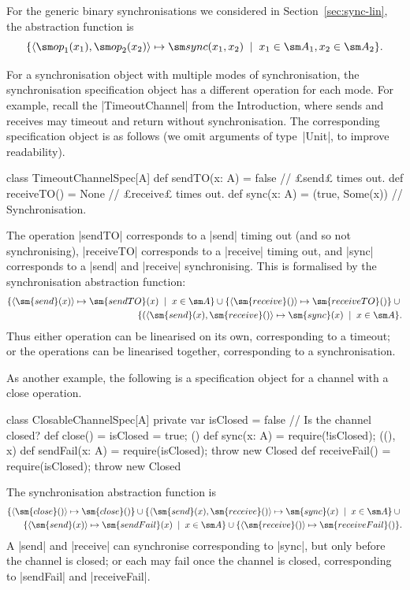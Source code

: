 For the generic binary synchronisations we considered in
Section~\ref{sec:sync-lin}, the abstraction function is
\[
\set{ \seq{\op_1(x_1), \op_2(x_2)} \mapsto \sync(x_1,x_2) \midd 
  x_1 \in \sm A_1, x_2 \in \sm A_2 }.
\]

For a synchronisation object with multiple modes of synchronisation, the
synchronisation specification object has a different operation for each mode.
For example, recall the |TimeoutChannel| from the Introduction, where sends
and receives may timeout and return without synchronisation.  The
corresponding specification object is as follows (we omit arguments of
type~|Unit|, to improve readability).
%
\begin{scala}
class TimeoutChannelSpec[A]{
  def sendTO(x: A) = false       // £send£ times out.
  def receiveTO() = None  // £receive£ times out.
  def sync(x: A) = (true, Some(x))  // Synchronisation.
}
\end{scala}
%
The operation |sendTO| corresponds to a |send| timing out (and so not
synchronising), |receiveTO| corresponds to a |receive| timing out, and
|sync| corresponds to a |send| and |receive| synchronising.  This is
formalised by the synchronisation abstraction function:
\[
\begin{align}
\set{ \seq{ \sm{send}(x) } \mapsto \sm{sendTO}(x)  \midd x \in \sm A } \union{} 
\set{ \seq{ \sm{receive}() } \mapsto \sm{receiveTO}()  } \union{}  \\
\set{ ( \seq{ \sm{send}(x), \sm{receive}() } \mapsto \sm{sync}(x) \midd
      x \in \sm A }.
\end{align}
\]
Thus either operation can be linearised on its own, corresponding to a
timeout; or the operations can be linearised together, corresponding to a
synchronisation. 

As another example, the following is a specification object for a channel with
a close operation.
%
\begin{scala}
class ClosableChannelSpec[A]{
  private var isClosed = false  // Is the channel closed? 
  def close() = { isClosed = true; () }
  def sync(x: A) = { require(!isClosed); ((), x) }
  def sendFail(x: A) = { require(isClosed); throw new Closed }
  def receiveFail() = { require(isClosed); throw new Closed }
}
\end{scala}
%
The synchronisation abstraction function is
\[
\begin{align}
\set{ \seq{\sm{close}()} \mapsto \sm{close}() }  \union 
\set{ \seq{ \sm{send}(x), \sm{receive}() } \mapsto \sm{sync}(x) \midd
      x \in \sm A } \union\null \\
\set{ \seq{ \sm{send}(x) } \mapsto \sm{sendFail}(x)  
  \midd x \in \sm A } \union{} 
\set{ \seq{ \sm{receive}() } \mapsto \sm{receiveFail}()  }.
\end{align}
\]
A |send| and |receive| can synchronise corresponding to |sync|, but only before
the channel is closed; or each may fail once the channel is closed,
corresponding to |sendFail| and |receiveFail|.  

